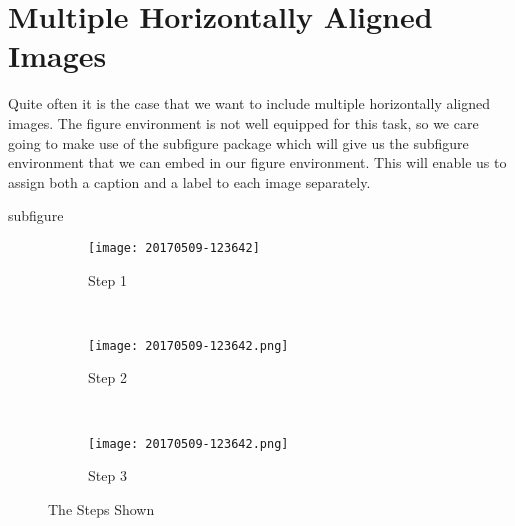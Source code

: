 \section{Multiple Horizontally Aligned Images}

Quite often it is the case that we want to include multiple horizontally
aligned images.  The figure environment is not well equipped for this task, so
we care going to make use of the subfigure package which will give us the 
subfigure environment that we can embed in our figure environment.  This will
enable us to assign both a caption and a label to each image separately.
\begin{docEnvironment}[doclang/environment content=image content goes here]{subfigure}{}{}
\begin{dispListing}
\begin{figure}
    \begin{center}
    \begin{subfigure}[b]{0.3\textwidth}
        \texttt{[image: 20170509-123642]}
        \caption{Step 1}
        \label{fig:step1a}
    \end{subfigure}
    ~   %
    \begin{subfigure}[b]{0.3\textwidth}
        \texttt{[image: 20170509-123642.png]}
        \caption{Step 2}
        \label{fig:step2a}
    \end{subfigure}
    ~   %
    \begin{subfigure}[b]{0.3\textwidth}
        \texttt{[image: 20170509-123642.png]}
        \caption{Step 3}
        \label{fig:step3a}
    \end{subfigure}
    \caption{The Steps Shown}\label{fig:threestepsa}
    \end{center}
\end{figure}
\end{dispListing}
\end{docEnvironment}
